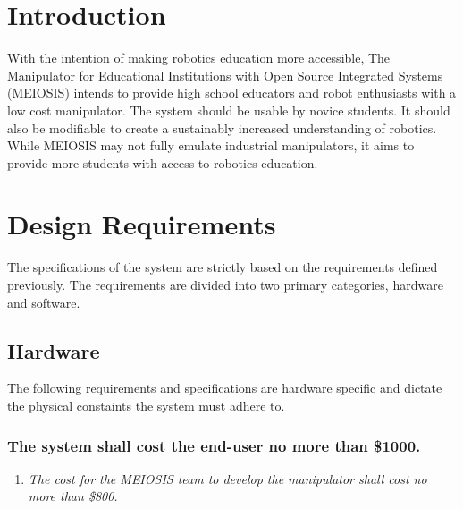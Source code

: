\documentclass[12pt]{report}
\begin{document}
\normalem

{\tableofcontents\let\clearpage\relax\listoffigures}
\clearpage
\newpage


{}

\section{Introduction}
\raggedright
With the intention of making robotics education more accessible, The Manipulator for Educational Institutions with Open Source Integrated Systems (MEIOSIS) intends to provide high school educators and robot enthusiasts with a low cost manipulator. The system should be usable by novice students. It should also be modifiable to create a sustainably increased understanding of robotics. While MEIOSIS may not fully emulate industrial manipulators, it aims to provide more students with access to robotics education.

\section{Design Requirements}
The specifications of the system are strictly based on the requirements defined previously. The requirements are divided into two primary categories, hardware and software.
\vspace{-\baselineskip}
\subsection{Hardware}
The following requirements and specifications are hardware specific and dictate the physical constaints the system must adhere to.
\vspace{-\baselineskip}
\subsubsection{The system shall cost the end-user no more than \$1000.}
\begin{enumerate}
  \item \textit{The cost for the MEIOSIS team to develop the manipulator shall cost no more than \$800.}
\end{enumerate}
\end{document}
